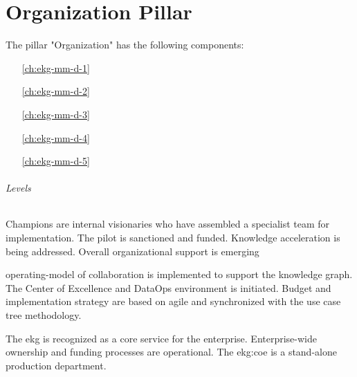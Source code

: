 \part{Organization Pillar}\label{pt:ekgmm-d} %

The pillar "Organization" has the following components:

\begin{itemize}[leftmargin=.5in]
    \item [\ref{ch:ekg-mm-d-1}] 
    \item [\ref{ch:ekg-mm-d-2}] 
    \item [\ref{ch:ekg-mm-d-3}] 
    \item [\ref{ch:ekg-mm-d-4}] 
    \item [\ref{ch:ekg-mm-d-5}] 
\end{itemize}

\paragraph{Levels}

\begin{description}[nosep,font=\bfseries]

    \item [1. \ekgmmLevelOneLabel]
    Champions are internal visionaries who have assembled a specialist team for implementation.
    The pilot is sanctioned and funded.
    Knowledge acceleration is being addressed.
    Overall organizational support is emerging

    \item [2. \ekgmmLevelTwoLabel]
    \Gls{operating-model} of collaboration is implemented to support the knowledge graph.
    The Center of Excellence and DataOps environment is initiated.
    Budget and implementation strategy are based on agile and synchronized with the
    use case tree methodology.

    \item [3. \ekgmmLevelThreeLabel]
    The \gls{ekg} is recognized as a core service for the enterprise.
    Enterprise-wide ownership and funding processes are operational.
    The \gls{ekg:coe} is a stand-alone production department.

\end{description}





